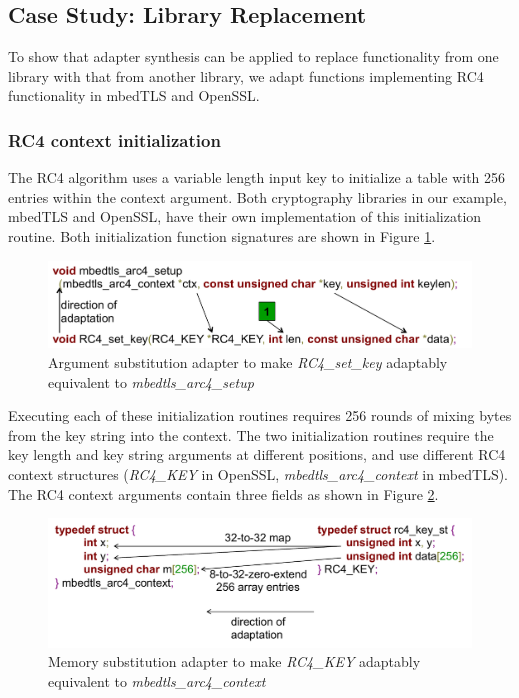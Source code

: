 \subsection{Case Study: Library Replacement}\label{subsec:rc4-experiment}
%
To show that adapter synthesis can be applied to replace functionality
from one library with that from another library, we adapt functions implementing RC4 functionality in mbedTLS and OpenSSL.
\noindent
\subsubsection{RC4 context initialization} The RC4 algorithm uses a
variable length input key to initialize a table with 256 entries within
the context argument.
%
Both cryptography libraries in our example, mbedTLS and OpenSSL, have their own implementation of this initialization routine.
%
Both initialization function signatures are shown in Figure \ref{fig:rc4setup_adapter}.
%
\begin{figure}[]
	\centering
	\caption{Argument substitution adapter to make \textit{RC4\_set\_key} adaptably equivalent to \textit{mbedtls\_arc4\_setup}}
	\label{fig:rc4setup_adapter}
	\includegraphics[width=\widthfactor\columnwidth]{chapters/adapter_synthesis/figures/rc4setup_adapter}
\end{figure}
%
Executing each of these initialization routines requires 256 rounds of
mixing bytes from the key string into the context.
%
%
The two initialization routines require the key length and key string arguments at different positions, and use different RC4 context structures (\textit{RC4\_KEY} in OpenSSL, \textit{mbedtls\_arc4\_context} in mbedTLS).
%
The RC4 context arguments contain three fields as shown in Figure \ref{fig:rc4_struct_adapter}.
%
\begin{figure}[]
	\centering
	\caption{Memory substitution adapter to make \textit{RC4\_KEY} adaptably equivalent to \textit{mbedtls\_arc4\_context}}
	\label{fig:rc4_struct_adapter}
	\includegraphics[width=\widthfactor\columnwidth]{chapters/adapter_synthesis/figures/rc4_struct_adapter}
\end{figure}
